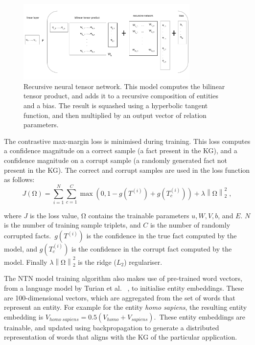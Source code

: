 \begin{figure}[H]
   	\centering
    	\includegraphics[width=0.8\textwidth, height=0.4\textwidth]{recursive_neural_tensor_network.png}
	\caption{Recursive neural tensor network. This model computes the bilinear tensor product, and adds it to a recursive composition of entities and a bias. The result is squashed using a hyperbolic tangent function, and then multiplied by an output vector of relation parameters.}
\end{figure}

\noindent The contrastive max-margin loss is minimised during training. This loss computes a confidence magnitude on a correct sample (a fact present in the KG), and a confidence magnitude on a corrupt sample (a randomly generated fact not present in the KG). The correct and corrupt samples are used in the loss function as follows:
\begin{equation}
	J(\si{\ohm}) =  \sum_{i=1}^N \sum_{c=1}^C \max(0,1 - g(T^{(i)}) + g(T_c^{(i)})) + \lambda \left \lVert \si{\ohm} \right \rVert_2^2 \; ,
\end{equation}

\noindent where $J$ is the loss value, $\si{\ohm}$ contains the trainable parameters $u, W, V, b $, and $ E $. $N$ is the number of training sample triplets, and $ C $ is the number of randomly corrupted facts.\ $ g(T^{(i)}) $ is the confidence in the true fact computed by the model, and $ g(T_c^{(i)}) $ is the confidence in the corrupt fact computed by the model. Finally $\lambda\left\lVert \si{\ohm} \right\rVert_2^2$ is the ridge ($L_2$) regulariser. \par

\noindent The NTN model training algorithm also makes use of pre-trained word vectors, from a language model by Turian et al. \unskip ~\citep{turian2010word}, to initialise entity embeddings. These are 100-dimensional vectors, which are aggregated from the set of words that represent an entity. For example for the entity \textit{homo sapiens}, the resulting entity embedding is $V_{homo \; sapiens} = 0.5(V_{homo} + V_{sapiens})$.\ These entity embeddings are trainable, and updated using backpropagation to generate a distributed representation of words that aligns with the KG of the particular application. \par

